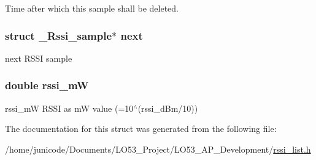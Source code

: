 Time after which this sample shall be deleted. 

\hypertarget{struct___rssi__sample_a32a692b80ab2d5ec54fffa4a8b4d4870}{}
\subsubsection[{next}]{\setlength{\rightskip}{0pt plus 5cm}struct {\bf \+\_\+\+Rssi\+\_\+sample}$\ast$ next}\label{struct___rssi__sample_a32a692b80ab2d5ec54fffa4a8b4d4870}


next R\+S\+S\+I sample 

\hypertarget{struct___rssi__sample_a76ef1fbf61be7fe0f22106b96e3b08df}{}
\subsubsection[{rssi\+\_\+m\+W}]{\setlength{\rightskip}{0pt plus 5cm}double rssi\+\_\+m\+W}\label{struct___rssi__sample_a76ef1fbf61be7fe0f22106b96e3b08df}


rssi\+\_\+m\+W R\+S\+S\+I as m\+W value (=10$^\wedge$(rssi\+\_\+d\+Bm/10)) 



The documentation for this struct was generated from the following file\+:\begin{DoxyCompactItemize}
\item 
/home/junicode/\+Documents/\+L\+O53\+\_\+\+Project/\+L\+O53\+\_\+\+A\+P\+\_\+\+Development/\hyperlink{rssi__list_8h}{rssi\+\_\+list.\+h}\end{DoxyCompactItemize}
